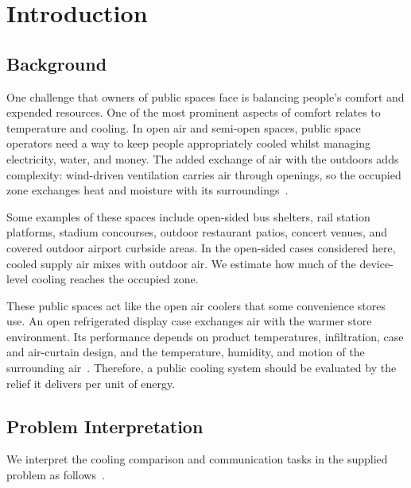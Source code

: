 
\section{Introduction}

\vspace{8 pt}

\vspace{8 pt}

\subsection{Background}

\vspace{8 pt}



One challenge that owners of public spaces face is balancing people’s comfort and expended resources. One of the most prominent aspects of comfort relates to temperature and cooling. In open air and semi-open spaces, public space operators need a way to keep people appropriately cooled whilst managing electricity, water, and money. The added exchange of air with the outdoors adds complexity: wind-driven ventilation carries air through openings, so the occupied zone exchanges heat and moisture with its surroundings~\cite{energyplus_wind_ventilation}.

\vspace{4 pt}

Some examples of these spaces include open-sided bus shelters, rail station platforms, stadium concourses, outdoor restaurant patios, concert venues, and covered outdoor airport curbside areas. In the open-sided cases considered here, cooled supply air mixes with outdoor air. We estimate how much of the device-level cooling reaches the occupied zone.

\vspace{4 pt}

These public spaces act like the open air coolers that some convenience stores use. An open refrigerated display case exchanges air with the warmer store environment. Its performance depends on product temperatures, infiltration, case and air-curtain design, and the temperature, humidity, and motion of the surrounding air~\cite{ashrae_refrigeration_2022}. Therefore, a public cooling system should be evaluated by the relief it delivers per unit of energy. 


\vspace{8 pt}

\subsection{Problem Interpretation}
We interpret the cooling comparison and communication tasks in the supplied problem as follows~\cite{comap_2026_problem_b}.

